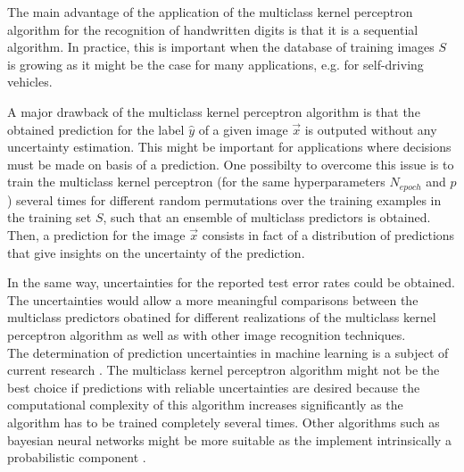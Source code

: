 The main advantage of the application of the multiclass kernel perceptron algorithm for the recognition of handwritten digits is that it is a sequential algorithm. In practice, this is important when the database of training images $S$ is growing as it might be the case for many applications, e.g. for self-driving vehicles.

A major drawback of the multiclass kernel perceptron algorithm is that the obtained prediction for the label $\hat{y}$ of a given image $\vec{x}$ is outputed without any uncertainty estimation. This might be important for applications where decisions must be made on basis of a prediction. One possibilty to overcome this issue is to train the multiclass kernel perceptron (for the same hyperparameters $N_{epoch}$ and $p$) several times for different random permutations over the training examples in the training set $S$, such that an ensemble of multiclass predictors is obtained. Then, a prediction for the image $\vec{x}$ consists in fact of a distribution of predictions that give insights on the uncertainty of the prediction. 

In the same way, uncertainties for the reported test error rates could be obtained. The uncertainties would allow a more meaningful comparisons between the multiclass predictors obatined for different realizations of the multiclass kernel perceptron algorithm as well as with other image recognition techniques.\\

The determination of prediction uncertainties in machine learning is a subject of current research \cite{dluncertainties2020}\cite{mluncertainties2007}. The multiclass kernel perceptron algorithm might not be the best choice if predictions with reliable uncertainties are desired because the computational complexity of this algorithm increases significantly as the algorithm has to be trained completely several times. Other algorithms such as bayesian neural networks might be more suitable as the implement intrinsically a probabilistic component \cite{bayesian2020}.